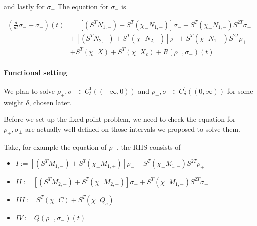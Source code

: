 \documentclass[letterpaper,11pt]{article}
\numberwithin{equation}{section}
\theoremstyle{plain}
\begin{document}
and lastly for $\sigma_-$
The equation for $\sigma_-$ is

\begin{align*}
\left(\frac{d}{dt} \sigma_- - \sigma_-\right)(t) &= [(S^{T}N_{1,-})+S^{T}(\chi_-N_{1,+})]\sigma_- + S^{T}(\chi_-N_{1,-})S^{2T}\sigma_+\\
&+[(S^{T}N_{2,-})+S^{T}(\chi_-N_{2,+})]\rho_- + S^{T}(\chi_-N_{1,-})S^{2T}\rho_+\\
& + S^{T}(\chi_-X)+S^{T}(\chi_-X_c) + R(\rho_-,\sigma_-)(t)
\end{align*}

\paragraph{Functional setting}

We plan to solve $\rho_+,\sigma_+ \in C^1_{\delta}((-\infty,0))$ and $\rho_-,\sigma_- \in C^1_{\delta}((0,\infty))$ for some weight $\delta$, chosen later.

Before we set up the fixed point problem, we need to check the equation for $\rho_\pm, \sigma_\pm$ are actually well-defined on those intervals we proposed to solve them.


Take, for example the equation of $\rho_-$, the RHS consists of
\begin{itemize}

\item $I:=[(S^{T}M_{1,-})+S^{T}(\chi_-M_{1,+})]\rho_- + S^{T}(\chi_-M_{1,-})S^{2T}\rho_+$


\item $II:=[(S^{T}M_{2,-})+S^{T}(\chi_-M_{2,+})]\sigma_- + S^{T}(\chi_-M_{1,-})S^{2T}\sigma_+$


\item $III:=S^{T}(\chi_-C)+S^{T}(\chi_-Q_c)  $

\item $IV:= Q(\rho_-,\sigma_-)(t)$
\end{itemize}
\end{document}
